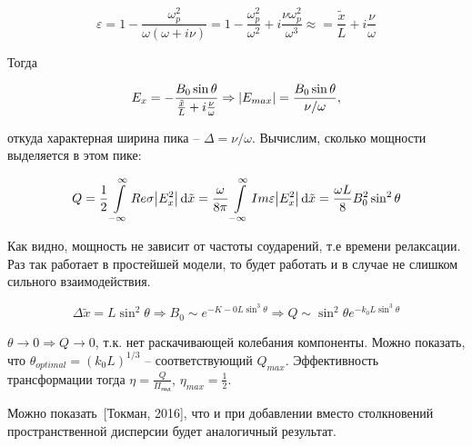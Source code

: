 \documentclass[10pt, a4paper]{article}
\newcommand{\Tokman}{~[Токман, 2016]}
\begin{document}
\begin{equation*}
	\varepsilon = 1-\frac{\omega_p^2}{\omega(\omega+i\nu)} = 1 - \frac{\omega_p^2}{\omega^2}+i\frac{\nu\omega_p^2}{\omega^3}\approx = \frac{\tilde{x}}{L}+i\frac{\nu}{\omega}
\end{equation*}

Тогда

\begin{equation*}
	E_x = -\frac{B_0\sin\theta}{\frac{\tilde{x}}{L}+i\frac{\nu}{\omega}} \Rightarrow \abs{E_{max}} = \frac{B_0\sin\theta}{\nu/\omega},
\end{equation*}

откуда характерная ширина пика -- $\Delta = \nu/\omega$. Вычислим, сколько мощности выделяется в этом пике:

\begin{equation*}
	Q = \frac{1}{2}\int\limits_{-\infty}^\infty Re\sigma\abs{E_x^2}\dd{\tilde{x}} = \frac{\omega}{8\pi} \int\limits_{-\infty}^\infty Im\varepsilon \abs{E_x^2}\dd{\tilde{x}} = \frac{\omega L}{8}B_0^2 \sin^2\theta 
\end{equation*}

Как видно, мощность не зависит от частоты соударений, т.е времени релаксации. Раз так работает в простейшей модели, то будет работать и в случае не слишком сильного взаимодействия.

\begin{equation*}
	\Delta \tilde{x} = L\sin^2\theta \Rightarrow B_0\sim e^{-K-0L\sin^3\theta} \Rightarrow Q \sim \sin^2\theta e^{-k_0L\sin^3\theta}
\end{equation*}

$\theta\rightarrow0\Rightarrow Q\rightarrow 0$, т.к. нет раскачивающей колебания компоненты. Можно показать, что $\theta_{optimal} = (k_0L)^{1/3}$ -- соответствующий $Q_{max}$. Эффективность трансформации тогда $\eta = \frac{Q}{\Pi_\text{пад}}$, $\eta_{max} = \frac{1}{2}$. 

Можно показать\Tokman, что и при добавлении вместо столкновений пространственной дисперсии будет аналогичный результат.
\end{document}
